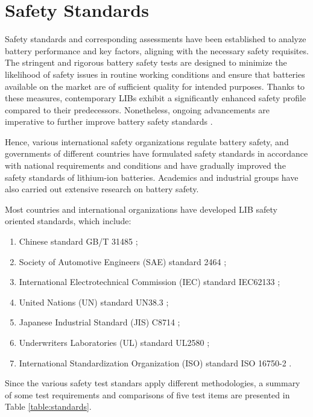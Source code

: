 \section{Safety Standards}
\label{sec:safety-standards}
Safety standards and corresponding assessments have been established to analyze battery performance and key factors, aligning with the necessary safety requisites. The stringent and rigorous battery safety tests are designed to minimize the likelihood of safety issues in routine working conditions and ensure that batteries available on the market are of sufficient quality for intended purposes. Thanks to these measures, contemporary LIBs exhibit a significantly enhanced safety profile compared to their predecessors. Nonetheless, ongoing advancements are imperative to further improve battery safety standards \cite{chen2021review}.

Hence, various international safety organizations regulate battery safety, and governments of different countries have formulated safety standards in accordance with national requirements and conditions and have gradually improved the safety standards of lithium-ion batteries. Academics and industrial groups have also carried out extensive research on battery safety.

Most countries and international organizations have developed LIB safety oriented standards, which include:
\begin{enumerate}
    \item Chinese standard GB/T 31485 \cite{GBT31485};
    \item Society of Automotive Engineers (SAE) standard 2464 \cite{SAE2464};
    \item International Electrotechnical Commission (IEC) standard IEC62133 \cite{IEC62133-2};
    \item United Nations (UN) standard UN38.3 \cite{UN38.3};
    \item Japanese Industrial Standard (JIS) C8714 \cite{JISC8714};
    \item Underwriters Laboratories (UL) standard UL2580 \cite{UL2580};
    \item International Standardization Organization (ISO) standard ISO 16750-2 \cite{ISO16750-2:2023}.
\end{enumerate}

Since the various safety test standars apply different methodologies, a summary of some test requirements and comparisons of five test items are presented in Table \ref{table:standards}.

